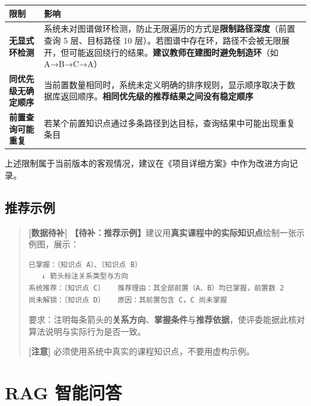 \documentclass[UTF8,a4paper,11pt]{ctexrep}
\newcommand{\todomark}{\textcolor{todobar}{\textbf{[数据待补]}}}
\newcommand{\warnmark}{\textcolor{todobar}{\textbf{[注意]}}}
\begin{document}
\begin{center}
\small
\begin{tabularx}{\linewidth}{@{}XX@{}}
\toprule
限制 & 影响 \\
\midrule
\textbf{无显式环检测} & 系统未对图谱做环检测，防止无限遍历的方式是\textbf{限制路径深度}（前置查询 5 层、目标路径 10 层）。若图谱中存在环，路径不会被无限展开，但可能返回绕行的结果。\textbf{建议教师在建图时避免制造环}（如 A→B→C→A） \\
\textbf{同优先级无确定顺序} & 当前置数量相同时，系统未定义明确的排序规则，显示顺序取决于数据库返回顺序。\textbf{相同优先级的推荐结果之间没有稳定顺序} \\
\textbf{前置查询可能重复} & 若某个前置知识点通过多条路径到达目标，查询结果中可能出现重复条目 \\
\bottomrule
\end{tabularx}
\end{center}
\begin{notebox}
上述限制属于当前版本的客观情况，建议在《项目详细方案》中作为改进方向记录。

\end{notebox}


\subsection{推荐示例}

\begin{quote}
\small
\todomark{} \textbf{【待补：推荐示例】}建议用\textbf{真实课程中的实际知识点}绘制一张示例图，展示：

\begin{Verbatim}[breaklines=true,breakanywhere=true,fontsize=\small,frame=single,framesep=4pt,rulecolor=\color{codeframe}]
已掌握：〔知识点 A〕、〔知识点 B〕
   ↓ 箭头标注关系类型与方向
系统推荐：〔知识点 C〕   推荐理由：其全部前置（A、B）均已掌握，前置数 2
尚未解锁：〔知识点 D〕   原因：其前置包含 C，C 尚未掌握
\end{Verbatim}

要求：注明每条箭头的\textbf{关系方向}、\textbf{掌握条件}与\textbf{推荐依据}，使评委能据此核对算法说明与实际行为是否一致。

\warnmark{} 必须使用系统中真实的课程知识点，不要用虚构示例。

\end{quote}


\section{RAG 智能问答}
\end{document}
